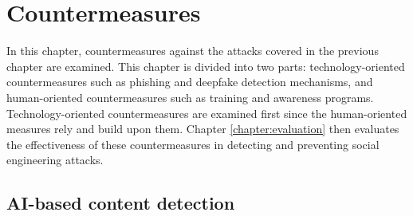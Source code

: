 


\chapter{Countermeasures\label{chapter:countermeasures}}

\begin{comment}

Guides:
    - 

TODO:
    [ ] 

What to cover:
    - AI monitoring content and informing the user if something they are about to share could be used against them or their organization?
    - AI generated training content suited to the personality of the user
    - Policies and EU etc regulations about the development of AI tech

\end{comment}

In this chapter, countermeasures against the attacks covered in the previous chapter are examined. This chapter is divided into two parts: technology-oriented countermeasures such as phishing and deepfake detection mechanisms, and human-oriented countermeasures such as training and awareness programs. Technology-oriented countermeasures are examined first since the human-oriented measures rely and build upon them. Chapter \ref{chapter:evaluation} then evaluates the effectiveness of these countermeasures in detecting and preventing social engineering attacks.















\section{AI-based content detection}

\begin{comment}

AI-generated content detection

What to cover:
    - Deepfake content detection
    - Spear phishing detection
        - Also spear phishing that is written by humans (thus the title can't be AI-generated content detection?)

    
\end{comment}


